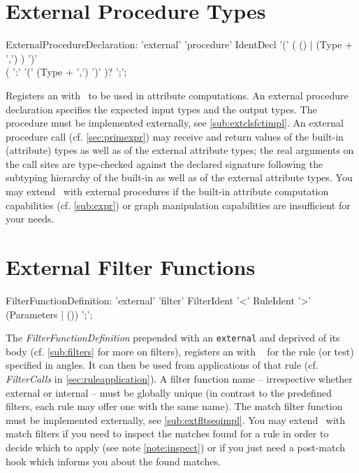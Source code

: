 \section{External Procedure Types}\label{sub:extproc}
\begin{rail}
  ExternalProcedureDeclaration: 'external' 'procedure' IdentDecl '(' ( () | (Type + ',') ) ')' \\ ( ':' '(' (Type + ',') ')' )? ';';
\end{rail}
Registers an  with \GrG~to be used in attribute computations.
An external procedure declaration specifies the expected input types and the output types. The procedure must be implemented externally, see \ref{sub:extclsfctimpl}.
An external procedure call (cf. \ref{sec:primexpr}) may receive and return values of the built-in (attribute) types as well as of the external attribute types; the real arguments on the call sites are type-checked against the declared signature following the subtyping hierarchy of the built-in as well as of the external attribute types.
You may extend \GrG~with external procedures if the built-in attribute computation capabilities (cf. \ref{sub:expr}) or graph manipulation capabilities are insufficient for your needs.

\section{External Filter Functions}\label{sub:extflt}

\begin{rail}
	FilterFunctionDefinition: 'external' 'filter' FilterIdent '<' RuleIdent '>' (Parameters | ()) ';';
\end{rail}

The \emph{FilterFunctionDefinition} prepended with an \texttt{external} and deprived of its body (cf. \ref{sub:filters} for more on filters), 
registers an  with \GrG~ for the rule (or test) specified in angles.
It can then be used from applications of that rule (cf. \emph{FilterCalls} in \ref{sec:ruleapplication}).
A filter function name -- irrespective whether external or internal -- must be globally unique (in contrast to the predefined filters, each rule may offer one with the same name).
The match filter function must be implemented externally, see \ref{sub:extfltseqimpl}.
You may extend \GrG~with match filters if you need to inspect the matches found for a rule in order to decide which to apply (see note \ref{note:inspect}) or if you just need a post-match hook which informs you about the found matches.

